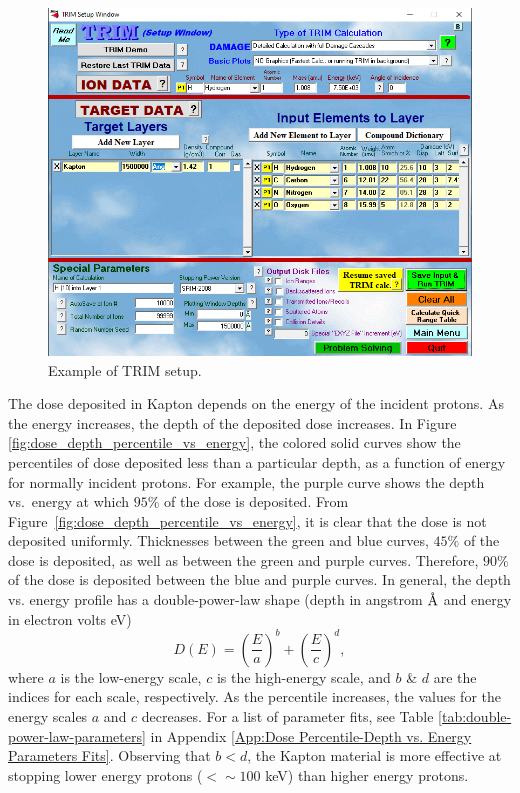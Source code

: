 \documentclass{hitec}
\newcommand{\angstrom}{\mbox{\normalfont\AA}}
\begin{document}
\begin{figure}[htbp!]
	\centering
	\includegraphics[width=1\textwidth]{../SRIM_setup.PNG}
	\caption{Example of TRIM setup.}\label{fig:SRIM_setup}
\end{figure}

The dose deposited in Kapton depends on the energy of the incident protons. As the energy increases, the depth of the deposited dose increases. In Figure \ref{fig:dose_depth_percentile_vs_energy}, the colored solid curves show the percentiles of dose deposited less than a particular depth, as a function of energy for normally incident protons. For example, the purple curve shows the depth vs.\ energy at which $95\%$ of the dose is deposited. From Figure~\ref{fig:dose_depth_percentile_vs_energy}, it is clear that the dose is not deposited  uniformly. Thicknesses between the green and blue curves, $45\%$ of the dose is deposited, as well as between the green and purple curves. Therefore, $90\%$ of the dose is deposited between the blue and purple curves. In general, the depth vs. energy profile has a double-power-law shape (depth in angstrom $\angstrom$ and energy in electron volts eV)
\begin{equation}\label{eq:double-power-law}
	D(E) = \left(\frac{E}{a}\right)^b + \left(\frac{E}{c}\right)^d,
\end{equation}
where $a$ is the low-energy scale, $c$ is the high-energy scale, and $b$ \& $d$ are the indices for each scale, respectively. As the percentile increases, the values for the energy scales $a$ and $c$ decreases. For a list of parameter fits, see Table \ref{tab:double-power-law-parameters} in Appendix \ref{App:Dose Percentile-Depth vs. Energy Parameters Fits}. Observing that $b < d$, the Kapton material is more effective at stopping lower energy protons ($ < \sim 100$ keV) than higher energy protons.
\end{document}
